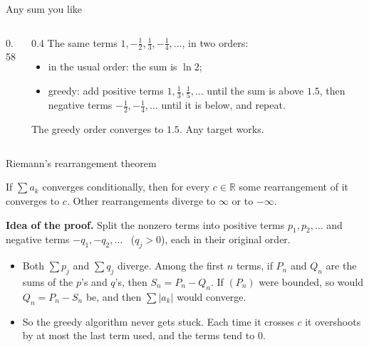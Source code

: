 \documentclass[10pt]{wosm-slides}
\newcommand{\R}{\mathbb{R}}
\begin{document}
\begin{frame}{Any sum you like}
\begin{columns}[c]
\begin{column}{0.58\textwidth}
    \end{column}
    \begin{column}{0.4\textwidth}
      \small
      The same terms $1, -\frac12, \frac13, -\frac14, \dots$, in two orders:
      \begin{itemize}
        \item {\color{wosm-accent}in the usual order}: the sum is $\ln 2$;
        \item {\color{wosm-brick}greedy}: add positive terms $1, \frac13, \frac15, \dots$
          until the sum is above $1.5$, then negative terms $-\frac12, -\frac14, \dots$
          until it is below, and repeat.
      \end{itemize}
      The greedy order converges to $1.5$. Any target works.
    \end{column}
  \end{columns}
\end{frame}

\begin{frame}{Riemann's rearrangement theorem}
  \begin{theorem}[Riemann]
    If $\sum a_k$ converges conditionally, then for every $c \in \R$ some rearrangement
    of it converges to $c$. Other rearrangements diverge to $\infty$ or to $-\infty$.
  \end{theorem}
  \pause
  \textbf{Idea of the proof.} Split the nonzero terms into positive terms $p_1, p_2, \dots$ and
  negative terms $-q_1, -q_2, \dots$ \ ($q_j > 0$), each in their original order.
  \begin{itemize}
    \item Both $\sum p_j$ and $\sum q_j$ diverge. Among the first $n$ terms, if $P_n$ and
      $Q_n$ are the sums of the $p$'s and $q$'s, then $S_n = P_n - Q_n$. If $(P_n)$ were
      bounded, so would $Q_n = P_n - S_n$ be, and then $\sum |a_k|$ would converge.
    \item So the greedy algorithm never gets stuck. Each time it crosses $c$ it overshoots by
      at most the last term used, and the terms tend to $0$.
  \end{itemize}
\end{frame}
\end{document}
